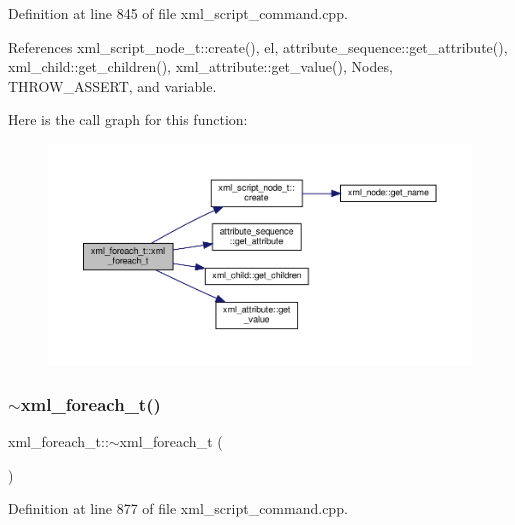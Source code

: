 Definition at line 845 of file xml\+\_\+script\+\_\+command.\+cpp.



References xml\+\_\+script\+\_\+node\+\_\+t\+::create(), el, attribute\+\_\+sequence\+::get\+\_\+attribute(), xml\+\_\+child\+::get\+\_\+children(), xml\+\_\+attribute\+::get\+\_\+value(), Nodes, T\+H\+R\+O\+W\+\_\+\+A\+S\+S\+E\+RT, and variable.

Here is the call graph for this function\+:
\nopagebreak
\begin{figure}[H]
\begin{center}
\leavevmode
\includegraphics[width=350pt]{d1/dc9/structxml__foreach__t_ab22830ff0fcf7c2f5c082cbc98fc1f67_cgraph}
\end{center}
\end{figure}
\mbox{\label{structxml__foreach__t_a9dc1c223543a6ecf0cd55846410b9f34}} 
\subsubsection{\texorpdfstring{$\sim$xml\+\_\+foreach\+\_\+t()}{~xml\_foreach\_t()}}
{\footnotesize\ttfamily xml\+\_\+foreach\+\_\+t\+::$\sim$xml\+\_\+foreach\+\_\+t (\begin{DoxyParamCaption}{ }\end{DoxyParamCaption})\hspace{0.3cm}{\ttfamily [override]}}



Definition at line 877 of file xml\+\_\+script\+\_\+command.\+cpp.



